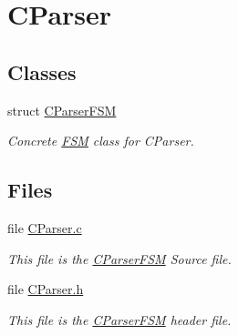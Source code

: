 \section{CParser}
\label{group___c_parser}
\subsection*{Classes}
\begin{DoxyCompactItemize}
\item 
struct \hyperlink{struct_c_parser_f_s_m}{CParserFSM}
\begin{DoxyCompactList}\small\item\em Concrete \hyperlink{struct_f_s_m}{FSM} class for CParser. \end{DoxyCompactList}\end{DoxyCompactItemize}
\subsection*{Files}
\begin{DoxyCompactItemize}
\item 
file \hyperlink{_c_parser_8c}{CParser.c}


\begin{DoxyCompactList}\small\item\em This file is the \hyperlink{struct_c_parser_f_s_m}{CParserFSM} Source file. \end{DoxyCompactList}

\item 
file \hyperlink{_c_parser_8h}{CParser.h}


\begin{DoxyCompactList}\small\item\em This file is the \hyperlink{struct_c_parser_f_s_m}{CParserFSM} header file. \end{DoxyCompactList}

\end{DoxyCompactItemize}

